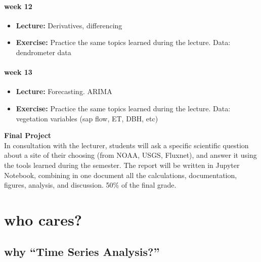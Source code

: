 \documentclass[
  letterpaper,
  DIV=11,
  numbers=noendperiod,
  oneside]{scrreprt}
\providecommand{\tightlist}{%
  \setlength{\itemsep}{0pt}\setlength{\parskip}{0pt}}\usepackage{longtable,booktabs,array}
\begin{document}
\hypertarget{week-12}{%
\subsubsection*{week 12}\label{week-12}}

\begin{itemize}
\tightlist
\item
  \textbf{Lecture:} Derivatives, differencing
\item
  \textbf{Exercise:} Practice the same topics learned during the
  lecture. Data: dendrometer data
\end{itemize}

\hypertarget{week-13}{%
\subsubsection*{week 13}\label{week-13}}

\begin{itemize}
\tightlist
\item
  \textbf{Lecture:} Forecasting. ARIMA
\item
  \textbf{Exercise:} Practice the same topics learned during the
  lecture. Data: vegetation variables (sap flow, ET, DBH, etc)
\end{itemize}

\textbf{Final Project}\\
In consultation with the lecturer, students will ask a specific
scientific question about a site of their choosing (from NOAA, USGS,
Fluxnet), and answer it using the tools learned during the semester. The
report will be written in Jupyter Notebook, combining in one document
all the calculations, documentation, figures, analysis, and discussion.
50\% of the final grade.


\hypertarget{who-cares}{%
\chapter*{who cares?}\label{who-cares}}


\hypertarget{why-time-series-analysis}{%
\section*{why ``Time Series
Analysis?''}\label{why-time-series-analysis}}
\end{document}
